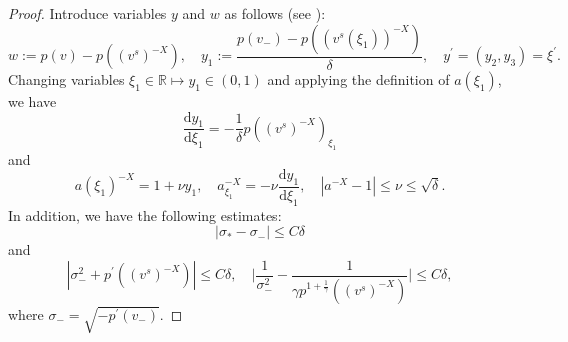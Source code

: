 \documentclass[10pt,reqno]{amsart}
\numberwithin{equation}{section}
\newcommand{\dif}{\mathrm{d}}
\begin{document}
\begin{proof}
Introduce variables $y$ and $w$ as follows (see \cite{WWS}):
\[
w:=p(v)-p((v^s)^{-X}),\quad
y_1:=\frac{p(v_-)-p((v^s(\xi_1))^{-X})}{\delta},\quad
y^{\prime}=(y_2, y_3)=\xi^{\prime}.
\]
Changing variables $\xi_1\in\mathbb{R}\mapsto y_1\in(0, 1)$ and applying the definition of $a(\xi_1)$, we have
$$\frac{\dif y_1}{\dif\xi_1}=-\frac{1}{\delta}p((v^s)^{-X})_{\xi_1}$$
 and
\begin{equation}\label{4.12}
a(\xi_1)^{-X}=1+\nu y_1,\quad
a^{-X}_{\xi_1}=-\nu\frac{\dif y_1}{\dif\xi_1},\quad
|a^{-X}-1|\le \nu\le\sqrt{\delta}.
\end{equation}
In addition, we have the following estimates:
\begin{equation}\label{4.13}
|\sigma_\ast-\sigma_-|\le C\delta
\end{equation}
and
\begin{equation}\label{4.14}
|\sigma_-^2+p^{\prime}((v^s)^{-X})|\le C\delta,\quad
\Big|\frac{1}{\sigma_-^2}-\frac{1}{\gamma p^{1+\frac{1}{\gamma}}((v^s)^{-X})}\Big|\le C\delta,
\end{equation}
where $\sigma_-=\sqrt{-p^{\prime}(v_-)}$.


\end{proof}
\end{document}
